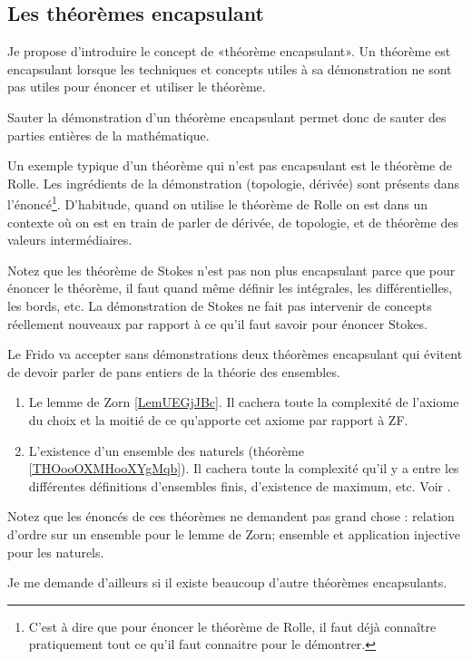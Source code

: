 \subsection{Les théorèmes encapsulant}
\label{SUBooThmEncapsulants}

\begin{normaltext}\label{NorooThmEncapsulants}
	Je propose d'introduire le concept de «théorème encapsulant». Un théorème est encapsulant lorsque les techniques et concepts utiles à sa démonstration ne sont pas utiles pour énoncer et utiliser le théorème.

	Sauter la démonstration d'un théorème encapsulant permet donc de sauter des parties entières de la mathématique.

	Un exemple typique d'un théorème qui n'est pas encapsulant est le théorème de Rolle. Les ingrédients de la démonstration (topologie, dérivée) sont présents dans l'énoncé\footnote{C'est à dire que pour énoncer le théorème de Rolle, il faut déjà connaître pratiquement tout ce qu'il faut connaitre pour le démontrer.}. D'habitude, quand on utilise le théorème de Rolle on est dans un contexte où on est en train de parler de dérivée, de topologie, et de théorème des valeurs intermédiaires.

	Notez que les théorème de Stokes n'est pas non plus encapsulant parce que pour énoncer le théorème, il faut quand même définir les intégrales, les différentielles, les bords, etc. La démonstration de Stokes ne fait pas intervenir de concepts réellement nouveaux par rapport à ce qu'il faut savoir pour énoncer Stokes.

	Le Frido va accepter sans démonstrations deux théorèmes encapsulant qui évitent de devoir parler de pans entiers de la théorie des ensembles.

	\begin{enumerate}
		\item
		      Le lemme de Zorn \ref{LemUEGjJBc}. Il cachera toute la complexité de l'axiome du choix et la moitié de ce qu'apporte cet axiome par rapport à ZF.

		\item
		      L'existence d'un ensemble des naturels (théorème \ref{THOooOXMHooXYgMqb}). Il cachera toute la complexité qu'il y a entre les différentes définitions d'ensembles finis, d'existence de maximum, etc. Voir \cite{BIBooGVVDooDoQSaM,BIBooFGIWooMkmaKH}.
	\end{enumerate}

	Notez que les énoncés de ces théorèmes ne demandent pas grand chose : relation d'ordre sur un ensemble pour le lemme de Zorn; ensemble et application injective pour les naturels.

	Je me demande d'ailleurs si il existe beaucoup d'autre théorèmes encapsulants.
\end{normaltext}

